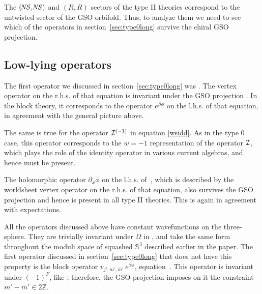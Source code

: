 \documentclass[12pt]{article}
\def\NS{{\it \!NS}}
\newcommand{\bS}{{\mathbb S}}
\newcommand{\bZ}{{\mathbb Z}}
\numberwithin{equation}{section}
\def\mbar{{\bar m}}
\begin{document}
The $(\NS,\NS)$ and $(\!R,\!R)$ sectors of the type II theories correspond to the untwisted sector of the GSO orbifold. Thus, to analyze them we need to see which of the operators in section~\ref{sec:type0long} survive the chiral GSO projection. 



\subsection{Low-lying operators}
\label{sec:block ops}



The first operator we discussed in section~\ref{sec:type0long} was \ebphiws. The vertex operator on the r.h.s. of that equation is invariant under the GSO projection \chiralGSO. In the block theory, it corresponds to the operator $e^{\beta\phi}$ on the l.h.s. of that equation, in agreement with the general picture above.

The same is true for the operator $\mathcal {I}^{(-1)}$ in equation \eqref{wsidd}. As in the type 0 case, this operator corresponds to the $w=-1$ representation of the operator $\mathcal {I}$, which plays the role of the identity operator in various current algebras, and hence must be present. 

The holomorphic operator $\partial_x\phi$ on the l.h.s. of~\dualbbzero, which is described by the worldsheet vertex operator on the r.h.s. of that equation, also survives the GSO projection and hence is present in all type II theories. This is again in agreement with expectations. 

All the operators discussed above have constant wavefunctions on the three-sphere. They are trivially invariant under $\Omega$ in \GSOphase, and take the same form throughout the moduli space of squashed $\bS^3$ described earlier in the paper. The first operator discussed in section~\ref{sec:type0long} that does not have this property is the block operator $v_{j';m',\bar m'} \, e^{\beta\phi}$, equation~\ebphivjmws. This operator is invariant under $(-1)^F$, like \ebphiws; therefore, the GSO projection imposes on it the constraint $m'-\mbar'\in 2\bZ$. 
\end{document}
